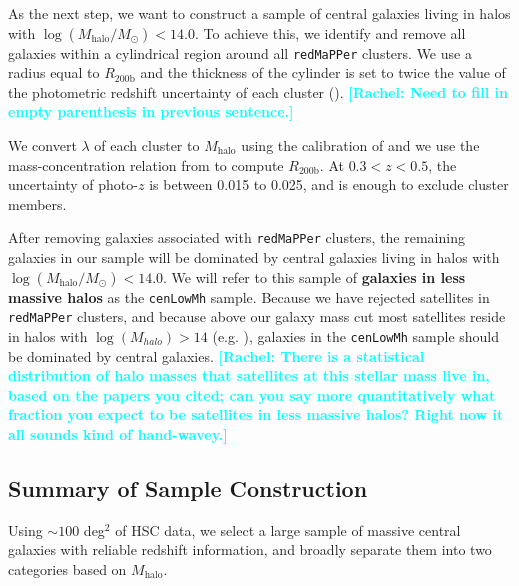 \documentclass[a4paper,fleqn,usenatbib]{mnras}
\def\redm{\texttt{redMaPPer}}
\def\nbcg{\texttt{cenLowMh}}
\def\logmh{{$\log (M_{\mathrm{halo}}/M_{\odot})$}}
\newcommand{\rachel}[1]{\textcolor{cyan}{\textbf{[Rachel: #1]}}}
\begin{document}
    As the next step, we want to construct a sample of central galaxies living in halos 
    with \logmh{}$<14.0$. 
    To achieve this, we identify and remove all galaxies within a cylindrical region 
    around all \redm{} clusters. 
    We use a radius equal to $R_{\mathrm{200b}}$ and the thickness of the cylinder is 
    set to twice the value of the photometric redshift uncertainty of each cluster ().
\rachel{Need to fill in empty parenthesis in previous sentence.}

    We convert $\lambda$ of each cluster to $M_{\mathrm{halo}}$ using the calibration 
    of \citet{Simet2016} and we use the mass-concentration relation from 
    \citet{Diemer2015} to compute $R_{\mathrm{200b}}$. 
    At $0.3 < z < 0.5$, the uncertainty of photo-$z$ is between 0.015 to 0.025, and 
    is enough to exclude cluster members.
    
    After removing galaxies associated with \redm{} clusters, the remaining galaxies 
    in our sample will be dominated by central galaxies living in halos with 
    \logmh{}$< 14.0$. 
    We will refer to this sample of \textbf{galaxies in less 
    massive halos} as the \nbcg{} sample. Because we have rejected satellites in \redm{} clusters, and because above our galaxy mass cut most satellites reside in halos with $\log{(M_{halo})}>14$ (e.g. \citealt{Reid2014, 
    Hoshino2015, Saito2016, vanUitert2016}), galaxies in the \nbcg{} sample should  be dominated by central galaxies.
    \rachel{There is a statistical distribution of halo masses that satellites at this stellar mass live in, based on the papers you cited; can you say more quantitatively what fraction you expect to be satellites in less massive halos?  Right now it all sounds kind of hand-wavey.}
    

\subsection{Summary of Sample Construction}
    \label{ssec:sample}

    Using ${\sim} 100$ deg$^2$ of HSC data, we select a large sample of massive central 
    galaxies with reliable redshift information, and broadly separate them into two 
    categories based on $M_{\mathrm{halo}}$.
    
\end{document}
